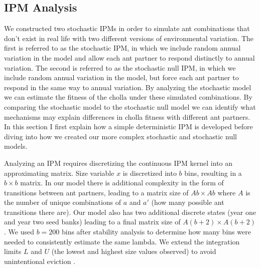 \documentclass[11pt]{article}
\begin{document}
\subsection*{IPM Analysis}
We constructed two stochastic IPMs in order to simulate ant combinations that don’t exist in real life with two different versions of environmental variation.
The first is referred to as the stochastic IPM, in which we include random annual variation in the model and allow each ant partner to respond distinctly to annual variation. 
The second is referred to as the stochastic null IPM, in which we include random annual variation in the model, but force each ant partner to respond in the same way to annual variation. 
By analyzing the stochastic model we can estimate the fitness of the cholla under these simulated combinations.
By comparing the stochastic model to the stochastic null model we can identify what mechanisms may explain differences in cholla fitness with different ant partners. 
In this section I first explain how a simple deterministic IPM is developed before diving into how we created our more complex stochastic and stochastic null models. 

Analyzing an IPM requires discretizing the continuous IPM kernel into an approximating matrix. 
Size variable $x$ is discretized into $b$ bins, resulting in a $b \times b$ matrix.
In our model there is additional complexity in the form of transitions between ant partners, leading to a matrix size of $A b \times A b$ where $A$ is the number of unique combinations of $a$ and $a'$ (how many possible ant transitions there are).
Our model also has two additional discrete states (year one and year two seed banks) leading to a final matrix size of $A(b+2) \times A(b+2)$.
We used $b = 200$ bins after stability analysis to determine how many bins were needed to consistently estimate the same lambda.
We extend the integration limits $L$ and $U$ (the lowest and highest size values observed) to avoid unintentional eviction \cite{Williams2012}.
\end{document}
